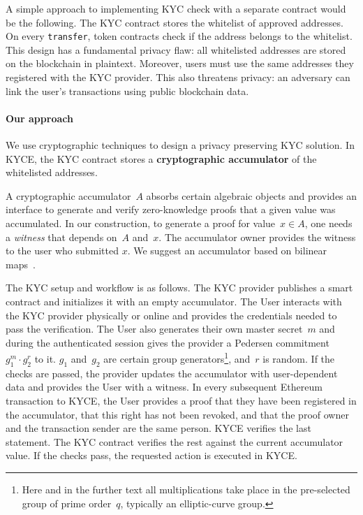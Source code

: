 A simple approach to implementing KYC check with a separate contract would be the following.
The KYC contract stores the whitelist of approved addresses.
On every \texttt{transfer}, token contracts check if the address belongs to the whitelist.
This design has a fundamental privacy flaw: all whitelisted addresses are stored on the blockchain in plaintext.
Moreover, users must use the same addresses they registered with the KYC provider.
This also threatens privacy: an adversary can link the user's transactions using public blockchain data.

\paragraph{Our approach}
We use cryptographic techniques to design a privacy preserving KYC solution.
In KYCE, the KYC contract stores a \textbf{cryptographic accumulator} of the whitelisted addresses. 

A cryptographic accumulator~$A$ absorbs certain algebraic objects and provides an interface to generate and verify zero-knowledge proofs that a given value was accumulated.
In our construction, to generate a proof for value~$x\in A$, one needs a \textit{witness} that depends on~$A$ and~$x$.
The accumulator owner provides the witness to the user who submitted $x$.
We suggest an accumulator based on bilinear maps~\cite{Camenisch2009}.

The KYC setup and workflow is as follows.
The KYC provider publishes a smart contract and initializes it with an empty accumulator.
The User interacts with the KYC provider physically or online and provides the credentials needed to pass the verification.
The User also generates their own master secret~$m$ and during the authenticated session gives the provider a Pedersen commitment~$g_1^m\cdot g_2^r$ to it.
$g_1$ and~$g_2$ are certain group generators\footnote{Here and in the further text all multiplications take place in the pre-selected group of prime order~$q$, typically an elliptic-curve group.}, and~$r$ is random.
If the checks are passed, the provider updates the accumulator with user-dependent data and provides the User with a witness.
In every subsequent Ethereum transaction to KYCE, the User provides a proof that they have been registered in the accumulator, that this right has not been revoked, and that the proof owner and the transaction sender are the same person.
KYCE verifies the last statement.
The KYC contract verifies the rest against the current accumulator value.
If the checks pass, the requested action is executed in KYCE.


